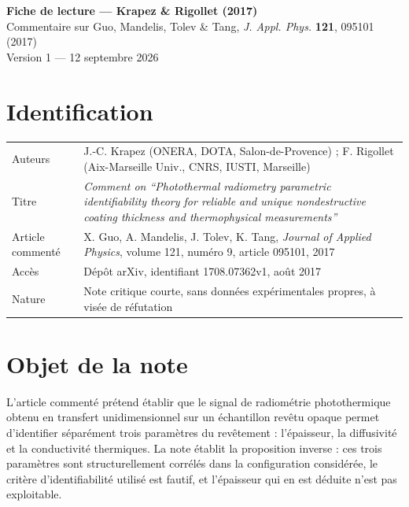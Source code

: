 \documentclass[11pt,a4paper]{article}
\begin{document}
\begin{center}
{\Large\bfseries Fiche de lecture --- Krapez \& Rigollet (2017)}\\[4pt]
{\small Commentaire sur Guo, Mandelis, Tolev \& Tang, \emph{J. Appl. Phys.} \textbf{121}, 095101 (2017)}\\[2pt]
{\small Version 1 --- 12 septembre 2026}
\end{center}

\vspace{4pt}

\section{Identification}

\begin{center}
\begin{tabularx}{\textwidth}{@{}lX@{}}
\toprule
Auteurs & J.-C. Krapez (ONERA, DOTA, Salon-de-Provence) ; F. Rigollet (Aix-Marseille Univ., CNRS, IUSTI, Marseille) \\
\addlinespace
Titre & \emph{Comment on ``Photothermal radiometry parametric identifiability theory for reliable
and unique nondestructive coating thickness and thermophysical measurements''} \\
\addlinespace
Article commenté & X. Guo, A. Mandelis, J. Tolev, K. Tang, \emph{Journal of Applied Physics}, volume 121,
numéro 9, article 095101, 2017 \\
\addlinespace
Accès & Dépôt arXiv, identifiant 1708.07362v1, août 2017 \\
\addlinespace
Nature & Note critique courte, sans données expérimentales propres, à visée de réfutation \\
\bottomrule
\end{tabularx}
\end{center}

\section{Objet de la note}

L'article commenté prétend établir que le signal de radiométrie photothermique obtenu en transfert
unidimensionnel sur un échantillon revêtu opaque permet d'identifier séparément trois paramètres du
revêtement : l'épaisseur, la diffusivité et la conductivité thermiques. La note établit la proposition
inverse : ces trois paramètres sont structurellement corrélés dans la configuration considérée, le
critère d'identifiabilité utilisé est fautif, et l'épaisseur qui en est déduite n'est pas exploitable.
\end{document}
